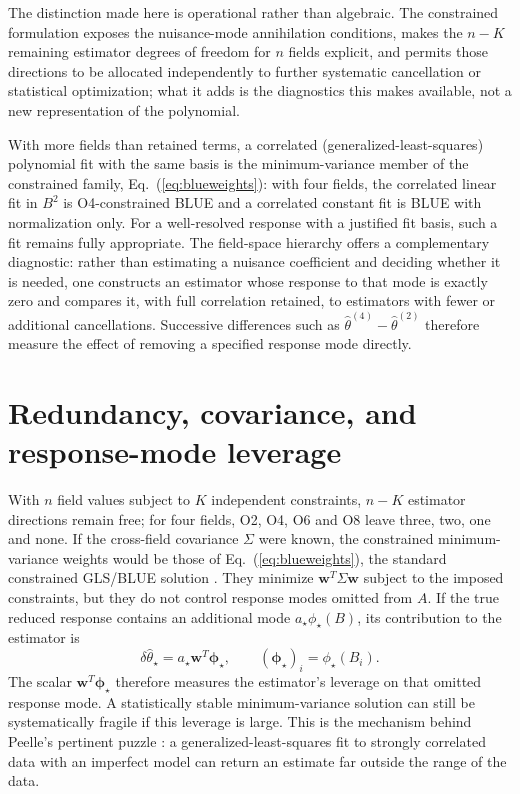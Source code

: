 \documentclass[aps,prd,preprint,nofootinbib,floatfix]{revtex4-2}
\begin{document}
The distinction made here is operational rather than algebraic. The constrained formulation exposes the nuisance-mode annihilation conditions, makes the $n-K$ remaining estimator degrees of freedom for $n$ fields explicit, and permits those directions to be allocated independently to further systematic cancellation or statistical optimization; what it adds is the diagnostics this makes available, not a new representation of the polynomial.

With more fields than retained terms, a correlated (generalized-least-squares) polynomial fit with the same basis is the minimum-variance member of the constrained family, Eq.~(\ref{eq:blueweights}): with four fields, the correlated linear fit in $B^2$ is O4-constrained BLUE and a correlated constant fit is BLUE with normalization only. For a well-resolved response with a justified fit basis, such a fit remains fully appropriate. The field-space hierarchy offers a complementary diagnostic: rather than estimating a nuisance coefficient and deciding whether it is needed, one constructs an estimator whose response to that mode is exactly zero and compares it, with full correlation retained, to estimators with fewer or additional cancellations. Successive differences such as $\widehat\theta^{(4)}-\widehat\theta^{(2)}$ therefore measure the effect of removing a specified response mode directly.

\section{Redundancy, covariance, and response-mode leverage}
\label{sec:leverage}

With $n$ field values subject to $K$ independent constraints, $n-K$ estimator directions remain free; for four fields, O2, O4, O6 and O8 leave three, two, one and none.
If the cross-field covariance $\Sigma$ were known, the constrained minimum-variance weights would be those of Eq.~(\ref{eq:blueweights}), the standard constrained GLS/BLUE solution \cite{ValassiChierici2014}. They minimize $\bm w^T\Sigma\bm w$ subject to the imposed constraints, but they do not control response modes omitted from $A$. If the true reduced response contains an additional mode $a_\star\phi_\star(B)$, its contribution to the estimator is
\begin{equation}
\delta\widehat\theta_\star
=a_\star\bm w^T\bm\phi_\star,
\qquad
(\bm\phi_\star)_i=\phi_\star(B_i).
\label{eq:leverage}
\end{equation}
The scalar $\bm w^T\bm\phi_\star$ therefore measures the estimator's leverage on that omitted response mode. A statistically stable minimum-variance solution can still be systematically fragile if this leverage is large. This is the mechanism behind Peelle's pertinent puzzle \cite{DAgostini1994}: a generalized-least-squares fit to strongly correlated data with an imperfect model can return an estimate far outside the range of the data.
\end{document}
